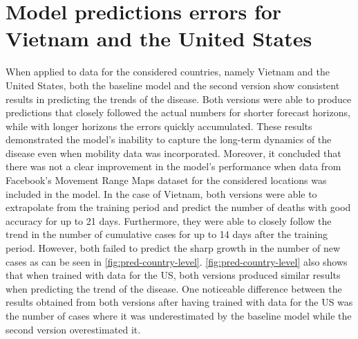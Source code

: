 \section{Model predictions errors for Vietnam and the United States}

When applied to data for the considered countries, namely Vietnam and the United States, both the baseline model and the second version show consistent results in predicting the trends of the disease.
Both versions were able to produce predictions that closely followed the actual numbers for shorter forecast horizons, while with longer horizons the errors quickly accumulated.
These results demonstrated the model's inability to capture the long-term dynamics of the disease even when mobility data was incorporated.
Moreover, it concluded that there was not a clear improvement in the model's performance when data from Facebook's Movement Range Maps dataset for the considered locations was included in the model.
In the case of Vietnam, both versions were able to extrapolate from the training period and predict the number of deaths with good accuracy for up to 21 days.
Furthermore, they were able to closely follow the trend in the number of cumulative cases for up to 14 days after the training period.
However, both failed to predict the sharp growth in the number of new cases as can be seen in \autoref{fig:pred-country-level}.
\autoref{fig:pred-country-level} also shows that when trained with data for the \gls{US}, both versions produced similar results when predicting the trend of the disease.
One noticeable difference between the results obtained from both versions after having trained with data for the \gls{US} was the number of cases where it was underestimated by the baseline model while the second version overestimated it.


